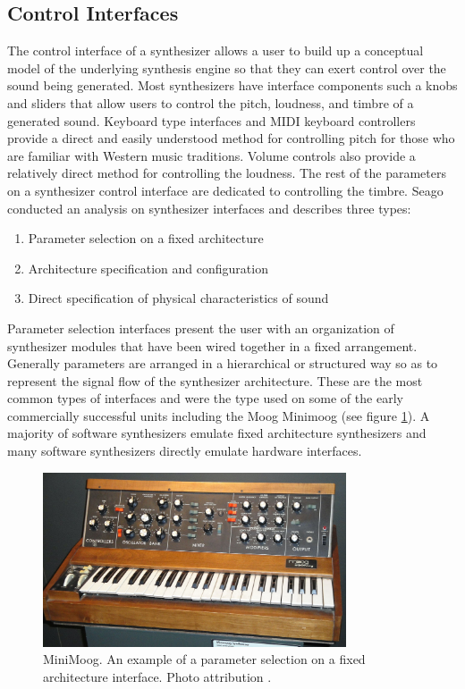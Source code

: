 \subsection{Control Interfaces}
\label{sec:control_interfaces}

The control interface of a synthesizer allows a user to build up a conceptual model of the underlying synthesis engine so that they can exert control over the sound being generated. Most synthesizers have interface components such a knobs and sliders that allow users to control the pitch, loudness, and timbre of a generated sound. Keyboard type interfaces and MIDI keyboard controllers provide a direct and easily understood method for controlling pitch for those who are familiar with Western music traditions. Volume controls also provide a relatively direct method for controlling the loudness. The rest of the parameters on a synthesizer control interface are dedicated to controlling the timbre. Seago \cite{seago2004critical} conducted an analysis on synthesizer interfaces and describes three types:
\begin{enumerate}
    \item Parameter selection on a fixed architecture
    \item Architecture specification and configuration
    \item Direct specification of physical characteristics of sound
\end{enumerate}

Parameter selection interfaces present the user with an organization of synthesizer modules that have been wired together in a fixed arrangement. Generally parameters are arranged in a hierarchical or structured way so as to represent the signal flow of the synthesizer architecture. These are the most common types of interfaces and were the type used on some of the early commercially successful units including the Moog Minimoog (see figure \ref{fig:minimoog}). A majority of software synthesizers emulate fixed architecture synthesizers and many software synthesizers directly emulate hardware interfaces.

\begin{figure}[ht]
    \centering
    \includegraphics[width=0.8\textwidth]{figures/background/minimoog.jpeg}
    \caption{MiniMoog. An example of a parameter selection on a fixed architecture interface. Photo attribution \cite{harden2009minimoog}.}
    \label{fig:minimoog}
\end{figure}

